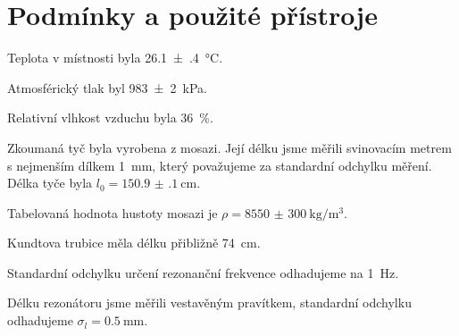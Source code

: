 \section*{Podmínky a použité přístroje}
Teplota v místnosti byla \SI{26.1(4)}{\degreeCelsius}.

Atmosférický tlak byl \SI{983(2)}{\kPa}.

Relativní vlhkost vzduchu byla \SI{36}{\percent}.

Zkoumaná tyč byla vyrobena z mosazi. 
Její délku jsme měřili svinovacím metrem s nejmenším dílkem \SI{1}{\mm}, který považujeme za standardní odchylku měření.
Délka tyče byla $l_0 = \SI{150.9(1)}{\cm}$.

Tabelovaná hodnota hustoty mosazi \cite{hustota} je $\rho =  \SI{8550(300)}{\kg\per\m\cubed}$.

Kundtova trubice měla délku přibližně \SI{74}{\cm}.

Standardní odchylku určení rezonanční frekvence odhadujeme na \SI{1}{\Hz}.

Délku rezonátoru jsme měřili vestavěným pravítkem, standardní odchylku odhadujeme $\sigma_l = \SI{0.5}{\mm}$.